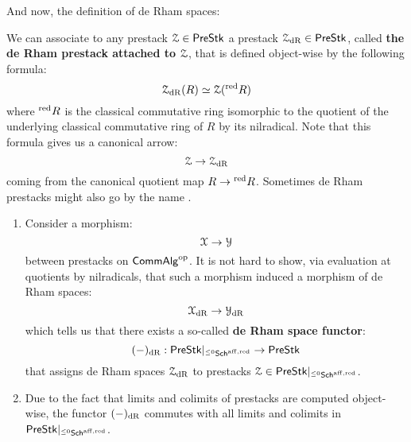                 And now, the definition of de Rham spaces:
                \begin{definition} \label{def: de_rham_prestacks}
                    We can associate to any prestack $\mathcal{Z} \in \mathsf{Pre}\mathsf{Stk}$ a prestack $\mathcal{Z}_{\mathrm{dR}} \in \mathsf{Pre}\mathsf{Stk}$, called \textbf{the de Rham prestack attached to $\mathcal{Z}$}, that is defined object-wise by the following formula:
                        $$\mathcal{Z}_{\mathrm{dR}}(R) \simeq \mathcal{Z}({}^{\mathrm{red}}R)$$
                    where ${}^{\mathrm{red}}R$ is the classical commutative ring isomorphic to the quotient of the underlying classical commutative ring of $R$ by its nilradical. Note that this formula gives us a canonical arrow:
                        $$\mathcal{Z} \to \mathcal{Z}_{\mathrm{dR}}$$
                    coming from the canonical quotient map $R \to {}^{\mathrm{red}}R$. Sometimes de Rham prestacks might also go by the name .
                \end{definition}
                \begin{remark} \label{remark: de_rham_prestacks_functoriality}
                    \noindent
                    \begin{enumerate}
                        \item Consider a morphism:
                            $$\mathcal{X} \to \mathcal{Y}$$
                        between prestacks on $\mathsf{Comm}\mathsf{Alg}^{\mathrm{op}}$. It is not hard to show, via evaluation at quotients by nilradicals, that such a morphism induced a morphism of de Rham spaces:
                            $$\mathcal{X}_{\mathrm{dR}} \to \mathcal{Y}_{\mathrm{dR}}$$
                        which tells us that there exists a so-called \textbf{de Rham space functor}:
                            $$(-)_{\mathrm{dR}}: \mathsf{Pre}\mathsf{Stk}|_{{}^{\leq 0}\mathsf{Sch}^{\mathrm{aff}, \mathrm{red}}} \to \mathsf{Pre}\mathsf{Stk}$$
                        that assigns de Rham spaces $\mathcal{Z}_{\mathrm{dR}}$ to prestacks $\mathcal{Z} \in \mathsf{Pre}\mathsf{Stk}|_{{}^{\leq 0}\mathsf{Sch}^{\mathrm{aff}, \mathrm{red}}}$. 
                        \item Due to the fact that limits and colimits of prestacks are computed object-wise, the functor $(-)_{\mathrm{dR}}$ commutes with all limits and colimits in $\mathsf{Pre}\mathsf{Stk}|_{{}^{\leq 0}\mathsf{Sch}^{\mathrm{aff}, \mathrm{red}}}$.
                    \end{enumerate}
                \end{remark}
                
